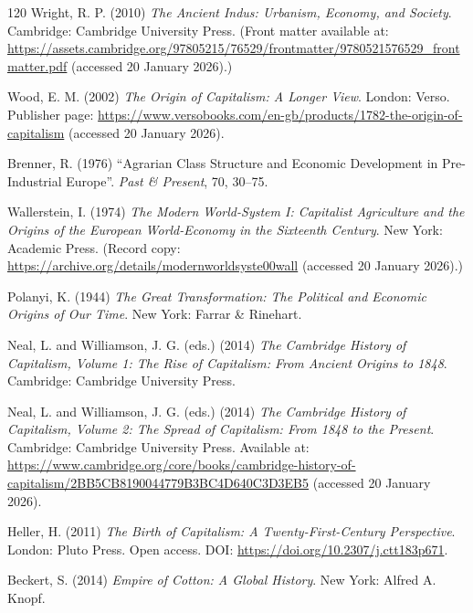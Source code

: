 \begin{singlespace}
\begin{thebibliography}{120}
Wright, R. P. (2010) \emph{The Ancient Indus: Urbanism, Economy, and Society}.
Cambridge: Cambridge University Press.
(Front matter available at: \url{https://assets.cambridge.org/97805215/76529/frontmatter/9780521576529_frontmatter.pdf} (accessed 20 January 2026).)


Wood, E. M. (2002) \emph{The Origin of Capitalism: A Longer View}.
London: Verso.
Publisher page: \url{https://www.versobooks.com/en-gb/products/1782-the-origin-of-capitalism} (accessed 20 January 2026).

Brenner, R. (1976) ``Agrarian Class Structure and Economic Development in Pre-Industrial Europe''.
\emph{Past \& Present}, 70, 30--75.

Wallerstein, I. (1974) \emph{The Modern World-System I: Capitalist Agriculture and the Origins of the European World-Economy in the Sixteenth Century}.
New York: Academic Press.
(Record copy: \url{https://archive.org/details/modernworldsyste00wall} (accessed 20 January 2026).)

Polanyi, K. (1944) \emph{The Great Transformation: The Political and Economic Origins of Our Time}.
New York: Farrar \& Rinehart.

Neal, L. and Williamson, J. G. (eds.) (2014) \emph{The Cambridge History of Capitalism, Volume 1: The Rise of Capitalism: From Ancient Origins to 1848}. Cambridge: Cambridge University Press.

Neal, L. and Williamson, J. G. (eds.) (2014) \emph{The Cambridge History of Capitalism, Volume 2: The Spread of Capitalism: From 1848 to the Present}.
Cambridge: Cambridge University Press.
Available at: \url{https://www.cambridge.org/core/books/cambridge-history-of-capitalism/2BB5CB8190044779B3BC4D640C3D3EB5} (accessed 20 January 2026).

Heller, H. (2011) \emph{The Birth of Capitalism: A Twenty-First-Century Perspective}. London: Pluto Press. Open access. DOI: \url{https://doi.org/10.2307/j.ctt183p671}.

Beckert, S. (2014) \emph{Empire of Cotton: A Global History}.
New York: Alfred A. Knopf.


\end{thebibliography}
\end{singlespace}
